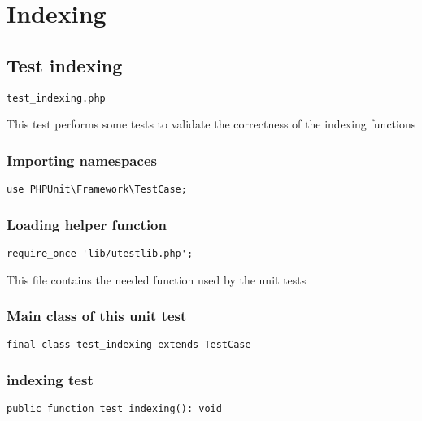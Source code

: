\documentclass[a4paper]{article}
\begin{document}
\hypertarget{toc267}{}
\section{Indexing}

\hypertarget{toc268}{}
\subsection{Test indexing}

\begin{lstlisting}
test_indexing.php
\end{lstlisting}

This test performs some tests to validate the correctness
of the indexing functions

\hypertarget{toc269}{}
\subsubsection{Importing namespaces}

\begin{lstlisting}
use PHPUnit\Framework\TestCase;
\end{lstlisting}

\hypertarget{toc270}{}
\subsubsection{Loading helper function}

\begin{lstlisting}
require_once 'lib/utestlib.php';
\end{lstlisting}

This file contains the needed function used by the unit tests

\hypertarget{toc271}{}
\subsubsection{Main class of this unit test}

\begin{lstlisting}
final class test_indexing extends TestCase
\end{lstlisting}

\hypertarget{toc272}{}
\subsubsection{indexing test}

\begin{lstlisting}
public function test_indexing(): void
\end{lstlisting}
\end{document}
